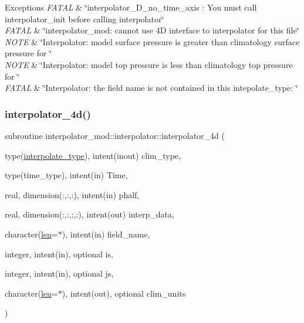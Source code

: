 \begin{DoxyExceptions}{Exceptions}
{\em F\+A\+T\+AL} & \char`\"{}interpolator\+\_\+D\+\_\+no\+\_\+time\+\_\+axis \+: You must call
                interpolator\+\_\+init before calling interpolator\char`\"{} \\
\hline
{\em F\+A\+T\+AL} & \char`\"{}interpolator\+\_\+mod\+: cannot use 4\+D interface to
                interpolator for this file\char`\"{} \\
\hline
{\em N\+O\+TE} & \char`\"{}\+Interpolator\+: model surface pressure is greater than
                climatology surface pressure for \char`\"{} \\
\hline
{\em N\+O\+TE} & \char`\"{}\+Interpolator\+: model top pressure is less than
                climatology top pressure for \char`\"{} \\
\hline
{\em F\+A\+T\+AL} & \char`\"{}\+Interpolator\+: the field name is not contained in this
                intepolate\+\_\+type\+: \char`\"{} \\
\hline
\end{DoxyExceptions}
\mbox{\label{interfaceinterpolator__mod_1_1interpolator_ae79df7db04c5ee92ce397eec4312d9ca}} 
\subsubsection{\texorpdfstring{interpolator\+\_\+4d()}{interpolator\_4d()}}
{\footnotesize\ttfamily subroutine interpolator\+\_\+mod\+::interpolator\+::interpolator\+\_\+4d (\begin{DoxyParamCaption}\item[{type(\hyperlink{structinterpolator__mod_1_1interpolate__type}{interpolate\+\_\+type}), intent(inout)}]{clim\+\_\+type,  }\item[{type(time\+\_\+type), intent(in)}]{Time,  }\item[{real, dimension(\+:,\+:,\+:), intent(in)}]{phalf,  }\item[{real, dimension(\+:,\+:,\+:,\+:), intent(out)}]{interp\+\_\+data,  }\item[{character(\hyperlink{namespaceinterpolator__mod_a6bd2ec3395203e1b6aba0610bfbfe16b}{len}=$\ast$), intent(in)}]{field\+\_\+name,  }\item[{integer, intent(in), optional}]{is,  }\item[{integer, intent(in), optional}]{js,  }\item[{character(\hyperlink{namespaceinterpolator__mod_a6bd2ec3395203e1b6aba0610bfbfe16b}{len}=$\ast$), intent(out), optional}]{clim\+\_\+units }\end{DoxyParamCaption})\hspace{0.3cm}{\ttfamily [private]}}



